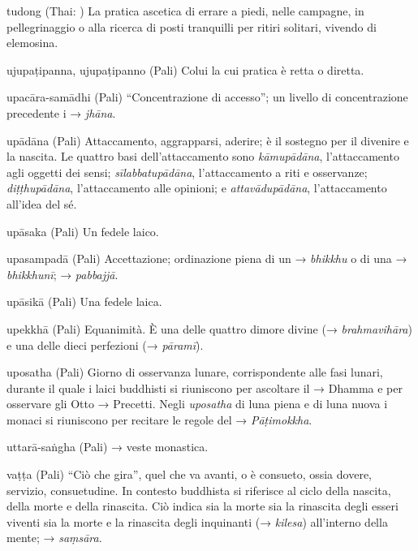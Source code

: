 \begin{glossarydescription}
\item[tudong] (Thai: ) La pratica ascetica di errare a
piedi, nelle campagne, in pellegrinaggio o alla ricerca di posti
tranquilli per ritiri solitari, vivendo di elemosina.


\item[ujupaṭipanna, ujupaṭipanno] (Pali) Colui la cui pratica è retta
o diretta.

\item[upacāra-samādhi] (Pali) ``Concentrazione di accesso''; un livello di
concentrazione precedente i → \emph{jhāna}.

\item[upādāna] (Pali) Attaccamento, aggrapparsi, aderire; è il sostegno per il
divenire e la nascita. Le quattro basi dell'attaccamento sono
\emph{kāmupādāna}, l'attaccamento agli oggetti dei sensi;
\emph{sīlabbatupādāna}, l'attaccamento a riti e osservanze;
\emph{diṭṭhupādāna}, l'attaccamento alle opinioni; e
\emph{attavādupādāna}, l'attaccamento all'idea del sé.

\item[upāsaka] (Pali) Un fedele laico.

\item[upasampadā] (Pali) Accettazione; ordinazione piena di un →
\emph{bhikkhu} o di una → \emph{bhikkhunī}; → \emph{pabbajjā}.

\item[upāsikā] (Pali) Una fedele laica.

\item[upekkhā] (Pali) Equanimità. È una delle quattro dimore divine (→
\emph{brahmavihāra}) e una delle dieci perfezioni (→ \emph{pāramī}).

\item[uposatha] (Pali) Giorno di osservanza lunare, corrispondente alle fasi
lunari, durante il quale i laici buddhisti si riuniscono per ascoltare
il → Dhamma e per osservare gli Otto → Precetti. Negli \emph{uposatha}
di luna piena e di luna nuova i monaci si riuniscono per recitare le
regole del → \emph{Pāṭimokkha}.

\item[uttarā-saṅgha] (Pali) → veste monastica.


\item[vaṭṭa] (Pali) ``Ciò che gira'', quel che va avanti, o è consueto, ossia
dovere, servizio, consuetudine. In contesto buddhista si riferisce al
ciclo della nascita, della morte e della rinascita. Ciò indica sia la
morte sia la rinascita degli esseri viventi sia la morte e la rinascita
degli inquinanti (→ \emph{kilesa}) all'interno della mente; →
\emph{saṃsāra}.


\end{glossarydescription}
